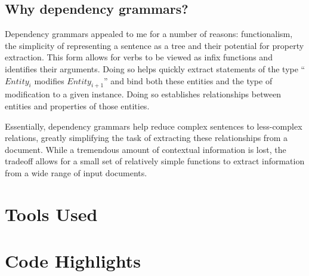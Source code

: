 \documentclass[11pt]{article}
\begin{document}
\subsection{Why dependency grammars?}

Dependency grammars appealed to me for a number of reasons: functionalism, the simplicity of representing a sentence as a tree and their potential for property extraction.  This form allows for verbs to be viewed as infix functions and identifies their arguments.  Doing so helps quickly extract statements of the type ``$Entity_{i}$ modifies $Entity_{i+1}$'' and bind both these entities and the type of modification to a given instance.  Doing so establishes relationships between entities and properties of those entities.  

Essentially, dependency grammars help reduce complex sentences to less-complex relations, greatly simplifying the task of extracting these relationships from a document.  While a tremendous amount of contextual information is lost, the tradeoff allows for a small set of relatively simple functions to extract information from a wide range of input documents.  




\section{Tools Used}

\section{Code Highlights}


\pagebreak

  
\end{document}
